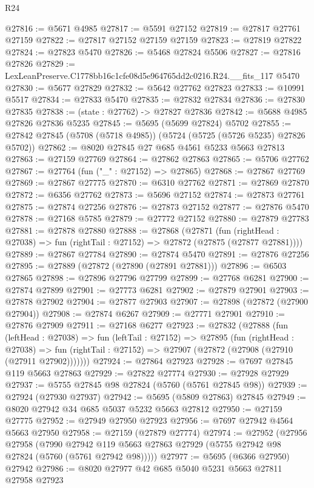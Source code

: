 \begin{lexlean}{R24}
\begin{coremodule}
@27816 := @5671 @4985
@27817 := @5591 @27152
@27819 := @27817 @27761 @27159
@27822 := @27817 @27152 @27159 @27159
@27823 := @27819 @27822
@27824 := @27823 @5470
@27826 := @5468 @27824 @5506
@27827 := @27816 @27826
@27829 := LexLeanPreserve.C1778bb16c1cfe08d5e964765dd2c0216.R24.__fits_117 @5470
@27830 := @5677 @27829
@27832 := @5642 @27762 @27823
@27833 := @10991 @5517
@27834 := @27833 @5470
@27835 := @27832 @27834
@27836 := @27830 @27835
@27838 := (state : @27762) -> @27827 @27836
@27842 := @5688 @4985 @27826 @27836 @5235
@27845 := @5695 (@5699 @27824) @5702
@27855 := @27842 @27845 (@5708 (@5718 @4985)) (@5724 (@5725 (@5726 @5235) @27826 @5702))
@27862 := @8020 @27845 @27 @685 @4561 @5233 @5663 @27813
@27863 := @27159 @27769
@27864 := @27862 @27863
@27865 := @5706 @27762
@27867 := @27764 (fun ("_" : @27152) => @27865)
@27868 := @27867 @27769
@27869 := @27867 @27775
@27870 := @6310 @27762
@27871 := @27869 @27870
@27872 := @6356 @27762
@27873 := @5696 @27152
@27874 := @27873 @27761
@27875 := @27874 @27256
@27876 := @27873 @27152
@27877 := @27876 @5470
@27878 := @27168 @5785
@27879 := @27772 @27152
@27880 := @27879 @27783
@27881 := @27878 @27880
@27888 := @27868
    (@27871
      (fun (rightHead : @27038) => fun (rightTail : @27152) => @27872 (@27875 (@27877 @27881))))
@27889 := @27867 @27784
@27890 := @27874 @5470
@27891 := @27876 @27256
@27895 := @27889 (@27872 (@27890 (@27891 @27881)))
@27896 := @6503 @27865
@27898 := @27896 @27796 @27799
@27899 := @27768 @6281
@27900 := @27874 @27899
@27901 := @27773 @6281
@27902 := @27879 @27901
@27903 := @27878 @27902
@27904 := @27877 @27903
@27907 := @27898 (@27872 (@27900 @27904))
@27908 := @27874 @6267
@27909 := @27771 @27901
@27910 := @27876 @27909
@27911 := @27168 @6277
@27923 := @27832
    (@27888
      (fun (leftHead : @27038) =>
      fun (leftTail : @27152) =>
      @27895
        (fun (rightHead : @27038) =>
        fun (rightTail : @27152) => @27907 (@27872 (@27908 (@27910 (@27911 @27902)))))))
@27924 := @27864 @27923
@27928 := @7697 @27845 @119 @5663 @27863
@27929 := @27822 @27774
@27930 := @27928 @27929
@27937 := @5755 @27845 @98 @27824 (@5760 (@5761 @27845 @98))
@27939 := @27924 (@27930 @27937)
@27942 := @5695 (@5809 @27863) @27845
@27949 := @8020 @27942 @34 @685 @5037 @5232 @5663 @27812
@27950 := @27159 @27775
@27952 := @27949 @27950 @27923
@27956 := @7697 @27942 @4564 @5663 @27950
@27958 := @27159 (@27879 @27774)
@27974 := @27952
    (@27956
      @27958
      (@7990 @27942 @119 @5663 @27863 @27929 (@5755 @27942 @98 @27824 (@5760 (@5761 @27942 @98)))))
@27977 := @5695 (@6366 @27950) @27942
@27986 := @8020 @27977 @42 @685 @5040 @5231 @5663 @27811 @27958 @27923

\end{coremodule}
\end{lexlean}
